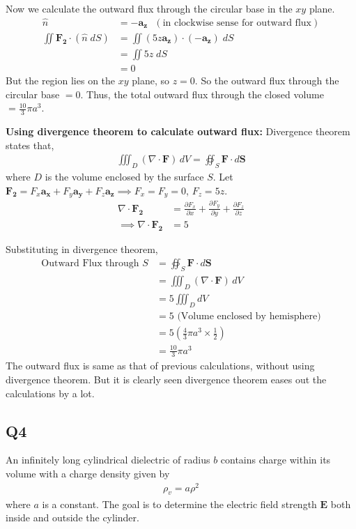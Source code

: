 \documentclass[12pt]{article}
\providecommand{\brak}[1]{\ensuremath{\left(#1\right)}}
\begin{document}
Now we calculate the outward flux through the circular base in the $xy$ plane.
\begin{align*}
    \hat{n} &= -\mathbf{a_z} \text{ } \brak{\text{in clockwise sense for outward flux}}\\
    \iint \mathbf{F_2} \cdot \brak{\hat{n}\;dS} &= \iint \brak{5z\mathbf{a_z}}\cdot\brak{-\mathbf{a_z}} \; dS\\
    &= \iint 5z \; dS \\
    &= 0
\end{align*}
But the region lies on the $xy$ plane, so $z = 0$. So the outward flux through the circular base $= 0$.
\newline
Thus, the total outward flux through the closed volume $= \frac{10}{3}\pi a^3$.

\textbf{Using divergence theorem to calculate outward flux:}
Divergence theorem states that,
\begin{align*}
    \iiint_{D} (\nabla \cdot \mathbf{F}) \, dV = \oiint_{S} \mathbf{F} \cdot d\mathbf{S} 
\end{align*}
where $D$ is the volume enclosed by the surface $S$.
\newline
Let $\mathbf{F_2} = F_x \mathbf{a_x} + F_y \mathbf{a_y} + F_z \mathbf{a_z} \implies F_x = F_y = 0$, $F_z = 5z$.
\begin{align*}
    \nabla \cdot \mathbf{F_2} &= \frac{\partial F_x}{\partial x} + \frac{\partial F_y}{\partial y} + \frac{\partial F_z}{\partial z}\\
    \implies \nabla \cdot \mathbf{F_2} &= 5
\end{align*}

Substituting in divergence theorem,
\begin{align*}
    \text{Outward Flux through } S &= \oiint_{S} \mathbf{F} \cdot d\mathbf{S}\\
    &= \iiint_{D} (\nabla \cdot \mathbf{F}) \, dV\\
    &= 5 \iiint_{D} dV\\
    &= 5 \text{ (Volume enclosed by hemisphere)}\\
    &= 5 \brak{\frac{4}{3} \pi a^3 \times \frac{1}{2}}\\
    &= \frac{10}{3} \pi a^3
\end{align*}
The outward flux is same as that of previous calculations, without using divergence theorem. But it is clearly seen divergence theorem eases out the calculations by a lot.

\subsection*{Q4}
An infinitely long cylindrical dielectric of radius $b$ contains charge within its volume with a charge density given by
\begin{align*}
\rho_v = a\rho^2
\end{align*}
where $a$ is a constant. The goal is to determine the electric field strength $\mathbf{E}$ both inside and outside the cylinder.
\end{document}
